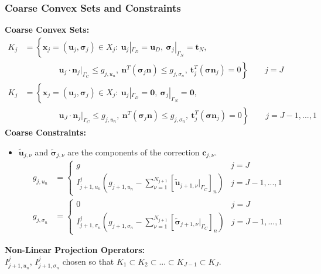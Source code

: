 \documentclass[8pt, oneside]{beamer}   	%
\newcommand{\bc}{\textbf{c}}
\newcommand{\bn}{\textbf{n}}
\newcommand{\bt}{\textbf{t}}
\newcommand{\bu}{\textbf{u}}
\newcommand{\bbx}{\textbf{x}}
\newcommand{\bsigma}{\boldsymbol{\sigma}}
\newcommand{\titlecolor}[1]{\frametitle{\textcolor{dkgrey}{ \textbf{#1}}}}
\begin{document}
\begin{frame}
\titlecolor{Coarse Convex Sets and Constraints}
\footnotesize
{ \textbf{Coarse Convex Sets:}}
\begin{align*}
  K_j&=\left\lbrace
  \bbx_j=(\bu_j, \bsigma_j) \in X_j: \: \bu_j|_{\Gamma_D}=\bu_D , \:  \bsigma_j|_{\Gamma_N}=\bt_N, \right. \\
   & \left.
    \qquad \qquad  
  \: \bu_j\cdot \bn_j|_{\Gamma_C}\leq g_{j,u_n}, \: \bn^T(\bsigma_j \bn)  \leq g_{j,\sigma_n}, \: \bt_j^T(\bsigma \bn_j) =0
  \right\rbrace  \qquad j=J\\
  K_j&=\left\lbrace
  \bbx_j=(\bu_j, \bsigma_j) \in X_j: \: \bu_j|_{\Gamma_D}=\textbf{0} , \:  \bsigma_j|_{\Gamma_N}=\textbf{0}, \right. \\
   & \left.
    \qquad \qquad  
  \: \bu_J\cdot \bn_j|_{\Gamma_C}\leq g_{j,u_n}, \: \bn^T(\bsigma_j \bn)  \leq g_{j,\sigma_n}, \: \bt_j^T(\bsigma \bn_j) =0
  \right\rbrace  \qquad j=J-1,...,1
\end{align*}
{ \textbf{Coarse Constraints:}}
\begin{itemize}
\item
$\tilde{\bu}_{j,\nu}$ and $\tilde{\bsigma}_{j,\nu}$ are the components of the correction $\bc_{j,\nu}$.
 \begin{align*}
{ g_{j,u_n}}&=
\begin{cases}
g & j=J \\
I_{j+1,u_n}^j \left( g_{j+1,u_n} - \sum_{\nu=1}^{N_{j+1}} \left[ \tilde{\bu}_{j+1,\nu} |_{\Gamma_C} \right]_n\right) & j=J-1,...,1
\end{cases}\\
{ g_{j,\sigma_n}}&=
\begin{cases}
0 & j=J \\
I_{j+1,\sigma_n}^j \left( g_{j+1,\sigma_n} - \sum_{\nu=1}^{N_{j+1}}  \left[ \tilde{\bsigma}_{j+1,\nu} |_{\Gamma_C}\right]_n \right) & j=J-1,...,1
\end{cases}
\end{align*}
\end{itemize}
{ \textbf{Non-Linear Projection Operators:}}\\
$   I_{j+1,u_n}^j $, $   I_{j+1,\sigma_n}^j $ chosen so that ${   K_1 \subset K_2 \subset ... \subset K_{J-1}\subset K_J}$.
\end{frame}
\end{document}

